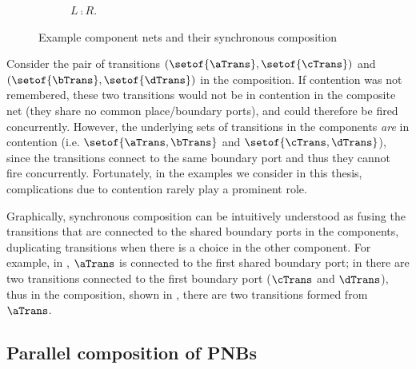 \begin{example}
\begin{figure}[ht]
\begin{subfigure}{\textwidth}
    \caption{$L \comp R$.}
    \label{fig:composeLR}
\end{subfigure}
\hfill
\caption{Example component nets and their synchronous composition}
\label{fig:exampleComposition}
\end{figure}

Consider the pair of transitions $(\setof{\aTrans}, \setof{\cTrans})$ and
$(\setof{\bTrans}, \setof{\dTrans})$ in the composition. If contention was not
remembered, these two transitions would not be in contention in the composite
net (they share no common place/boundary ports), and could therefore be fired
concurrently. However, the underlying sets of transitions in the components
\emph{are} in contention (i.e.  $\setof{\aTrans,\bTrans}$ and
$\setof{\cTrans,\dTrans}$), since the transitions connect to the same boundary
port and thus they cannot fire concurrently. Fortunately, in the examples we
consider in this thesis, complications due to contention rarely play a
prominent role.
\end{example}

Graphically, synchronous composition can be intuitively understood as fusing the
transitions that are connected to the shared boundary ports in the components,
duplicating transitions when there is a choice in the other component. For
example, in , $\aTrans$ is connected to the first shared
boundary port; in  there are two transitions connected
to the first boundary port ($\cTrans$ and $\dTrans$), thus in the composition,
shown in , there are two transitions formed from
$\aTrans$.

\subsection{Parallel composition of PNBs}

